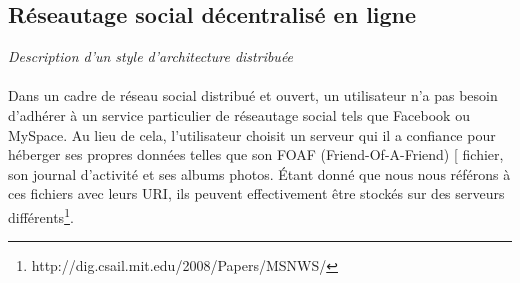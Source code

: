 \subsection{Réseautage social décentralisé en ligne}
\textit{Description d'un style d'architecture distribuée}\newline
\paragraph{}
Dans un cadre de réseau social distribué et ouvert, un utilisateur n'a pas besoin d'adhérer à un service particulier de réseautage social tels que Facebook ou MySpace. Au lieu de cela, l'utilisateur choisit un serveur qui il a confiance pour héberger ses propres données telles que son FOAF (Friend-Of-A-Friend) [ fichier, son journal d'activité et ses albums photos. Étant donné que nous nous référons à ces fichiers avec leurs URI, ils peuvent effectivement être stockés sur des serveurs différents\footnote{http://dig.csail.mit.edu/2008/Papers/MSNWS/}.

